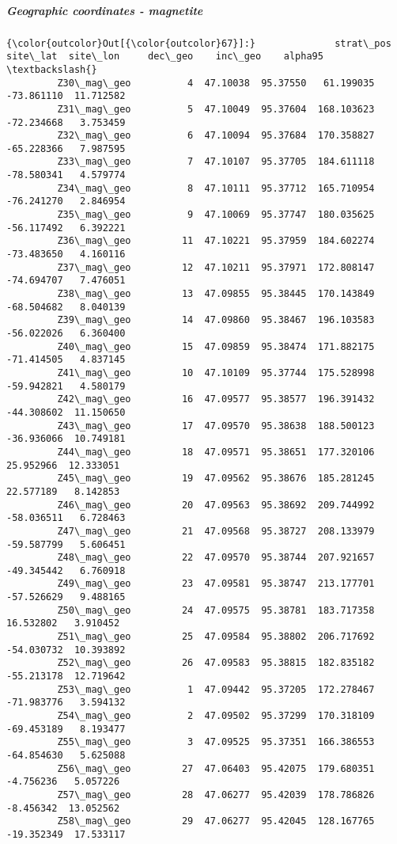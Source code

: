 \documentclass[11pt]{article}
\begin{document}
    \subparagraph{Geographic coordinates -
magnetite}\label{geographic-coordinates---magnetite}


            \begin{Verbatim}[commandchars=\\\{\}]
{\color{outcolor}Out[{\color{outcolor}67}]:}              strat\_pos  site\_lat  site\_lon     dec\_geo    inc\_geo    alpha95  \textbackslash{}
         Z30\_mag\_geo          4  47.10038  95.37550   61.199035 -73.861110  11.712582   
         Z31\_mag\_geo          5  47.10049  95.37604  168.103623 -72.234668   3.753459   
         Z32\_mag\_geo          6  47.10094  95.37684  170.358827 -65.228366   7.987595   
         Z33\_mag\_geo          7  47.10107  95.37705  184.611118 -78.580341   4.579774   
         Z34\_mag\_geo          8  47.10111  95.37712  165.710954 -76.241270   2.846954   
         Z35\_mag\_geo          9  47.10069  95.37747  180.035625 -56.117492   6.392221   
         Z36\_mag\_geo         11  47.10221  95.37959  184.602274 -73.483650   4.160116   
         Z37\_mag\_geo         12  47.10211  95.37971  172.808147 -74.694707   7.476051   
         Z38\_mag\_geo         13  47.09855  95.38445  170.143849 -68.504682   8.040139   
         Z39\_mag\_geo         14  47.09860  95.38467  196.103583 -56.022026   6.360400   
         Z40\_mag\_geo         15  47.09859  95.38474  171.882175 -71.414505   4.837145   
         Z41\_mag\_geo         10  47.10109  95.37744  175.528998 -59.942821   4.580179   
         Z42\_mag\_geo         16  47.09577  95.38577  196.391432 -44.308602  11.150650   
         Z43\_mag\_geo         17  47.09570  95.38638  188.500123 -36.936066  10.749181   
         Z44\_mag\_geo         18  47.09571  95.38651  177.320106  25.952966  12.333051   
         Z45\_mag\_geo         19  47.09562  95.38676  185.281245  22.577189   8.142853   
         Z46\_mag\_geo         20  47.09563  95.38692  209.744992 -58.036511   6.728463   
         Z47\_mag\_geo         21  47.09568  95.38727  208.133979 -59.587799   5.606451   
         Z48\_mag\_geo         22  47.09570  95.38744  207.921657 -49.345442   6.760918   
         Z49\_mag\_geo         23  47.09581  95.38747  213.177701 -57.526629   9.488165   
         Z50\_mag\_geo         24  47.09575  95.38781  183.717358  16.532802   3.910452   
         Z51\_mag\_geo         25  47.09584  95.38802  206.717692 -54.030732  10.393892   
         Z52\_mag\_geo         26  47.09583  95.38815  182.835182 -55.213178  12.719642   
         Z53\_mag\_geo          1  47.09442  95.37205  172.278467 -71.983776   3.594132   
         Z54\_mag\_geo          2  47.09502  95.37299  170.318109 -69.453189   8.193477   
         Z55\_mag\_geo          3  47.09525  95.37351  166.386553 -64.854630   5.625088   
         Z56\_mag\_geo         27  47.06403  95.42075  179.680351  -4.756236   5.057226   
         Z57\_mag\_geo         28  47.06277  95.42039  178.786826  -8.456342  13.052562   
         Z58\_mag\_geo         29  47.06277  95.42045  128.167765 -19.352349  17.533117   
         

\end{Verbatim}
\end{document}

